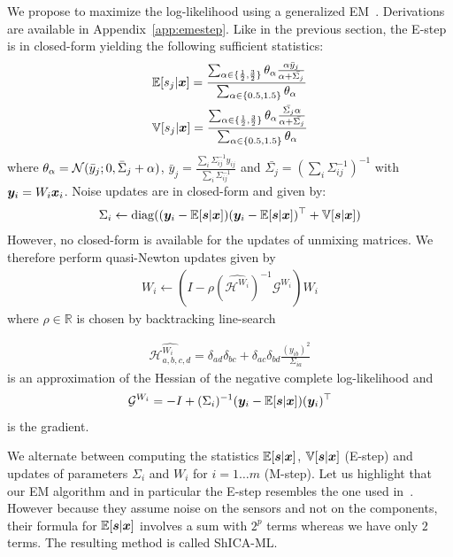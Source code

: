 We propose to maximize the log-likelihood using a generalized
EM~\cite{neal1998view, dempster1977maximum}. Derivations are available in Appendix~\ref{app:emestep}. Like in the previous section, the E-step is in closed-form yielding the following sufficient statistics:
  \begin{align}
    \label{mmse2}
    &\mathbb{E}[s_j | \boldsymbol{x}] = \frac{\sum_{\alpha \in \{\frac12, \frac32\}} \theta_{\alpha} \frac{\alpha \bar{y}_{j}}{\alpha + \bar{\Sigma_{j}}}}{\sum_{\alpha \in \{0.5, 1.5\}} \theta_{\alpha}} \\
    & \mathbb{V}[s_j | \boldsymbol{x}] = \frac{\sum_{\alpha \in \{\frac12, \frac32\}} \theta_{\alpha} \frac{\bar{\Sigma_{j}}\alpha}{\alpha + \bar{\Sigma_{j}}}}{\sum_{\alpha \in \{0.5, 1.5\}} \theta_{\alpha}}  
\end{align}
where $\theta_{\alpha} = \mathcal{N}(\bar{y}_{j}; 0 , \bar{\Sigma}_{j} + \alpha)$, 
$\bar{y}_j = \frac{\sum_i \Sigma_{ij}^{-1} y_{ij}}{ \sum_i
  \Sigma_{ij}^{-1}}$ and $\bar{\Sigma_{j}} = (\sum_i
\Sigma_{ij}^{-1})^{-1}$ with $\boldsymbol{y}_i = W_i \boldsymbol{x}_i$.
Noise updates are in closed-form and given by:
\begin{align}
\Sigma_i \leftarrow  \operatorname*{diag}((\boldsymbol{y}_i - \mathbb{E}[\boldsymbol{s} | \boldsymbol{x}]) (\boldsymbol{y}_i - \mathbb{E}[\boldsymbol{s} | \boldsymbol{x}])^{\top}+ \mathbb{V}[\boldsymbol{s} | \boldsymbol{x}])
\end{align}
However, no closed-form is available for the updates of unmixing matrices. We therefore perform quasi-Newton updates given by
\begin{align}
  W_i \leftarrow (I - \rho (\widehat{\mathcal{H}^{W_i}})^{-1} \mathcal{G}^{W_i}) W_i
\end{align}
where $\rho \in \mathbb{R}$ is chosen by backtracking line-search

\begin{align}
	\widehat{\mathcal{H}^{W_i}_{a, b, c, d}} =  \delta_{ad} \delta_{bc} + \delta_{ac} \delta_{bd}\frac{(y_{ib})^2}{\Sigma_{ia}}
\end{align}
is an approximation of the Hessian of the negative complete log-likelihood and
\begin{align}
	\mathcal{G}^{W_i} = -I + (\Sigma_i)^{-1}(\boldsymbol{y}_i - \mathbb{E}[\boldsymbol{s}|\boldsymbol{x}])(\boldsymbol{y}_i)^{\top}
\end{align}
 is the gradient.

We alternate between computing the statistics $\mathbb{E}[\boldsymbol{s}|\boldsymbol{x}]$, 
$\mathbb{V}[\boldsymbol{s}|\boldsymbol{x}]$ (E-step) and updates of parameters $\Sigma_i$ and $W_i$ for $i=1 \dots m$ (M-step). Let us highlight that our EM algorithm and in particular the E-step resembles the one used in~\cite{moulines1997maximum}. However because they assume noise on the sensors and not on the components, their formula for $\mathbb{E}[\boldsymbol{s}| \boldsymbol{x}]$ involves a sum with $2^p$ terms whereas we have only $2$ terms. The resulting method is called ShICA-ML.

